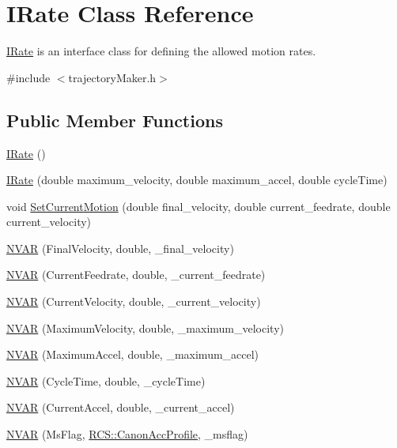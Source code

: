\hypertarget{classIRate}{\section{I\-Rate Class Reference}
\label{classIRate}
}


\hyperlink{classIRate}{I\-Rate} is an interface class for defining the allowed motion rates.  




{\ttfamily \#include $<$trajectory\-Maker.\-h$>$}

\subsection*{Public Member Functions}
\begin{DoxyCompactItemize}
\item 
\hyperlink{classIRate_a4cc7acdfa6770b7a28b3be6ec90110d9}{I\-Rate} ()
\item 
\hyperlink{classIRate_ab2d1966894aa6d963a20f5e6d18097de}{I\-Rate} (double maximum\-\_\-velocity, double maximum\-\_\-accel, double cycle\-Time)
\item 
void \hyperlink{classIRate_a9a6f938787dd958daef0f8eb2c0836fc}{Set\-Current\-Motion} (double final\-\_\-velocity, double current\-\_\-feedrate, double current\-\_\-velocity)
\item 
\hyperlink{classIRate_ad20f3c10a92de570de814b8c33c55813}{N\-V\-A\-R} (Final\-Velocity, double, \-\_\-final\-\_\-velocity)
\item 
\hyperlink{classIRate_ac083b3315892fb042e0240fa37635405}{N\-V\-A\-R} (Current\-Feedrate, double, \-\_\-current\-\_\-feedrate)
\item 
\hyperlink{classIRate_a52f26275fc49b2fd4c5b69291185a6db}{N\-V\-A\-R} (Current\-Velocity, double, \-\_\-current\-\_\-velocity)
\item 
\hyperlink{classIRate_a26f1529cb8c8cc9694ae82ed8e153563}{N\-V\-A\-R} (Maximum\-Velocity, double, \-\_\-maximum\-\_\-velocity)
\item 
\hyperlink{classIRate_aa338ed93323d145c8eb4e656625e9333}{N\-V\-A\-R} (Maximum\-Accel, double, \-\_\-maximum\-\_\-accel)
\item 
\hyperlink{classIRate_a9292518c87c8e371ba55b6aa49ad1706}{N\-V\-A\-R} (Cycle\-Time, double, \-\_\-cycle\-Time)
\item 
\hyperlink{classIRate_ac6149473cf0f8e1e6d90255e8da44e89}{N\-V\-A\-R} (Current\-Accel, double, \-\_\-current\-\_\-accel)
\item 
\hyperlink{classIRate_a6555656cff42f8e9f6e633876db9b6c1}{N\-V\-A\-R} (Ms\-Flag, \hyperlink{namespaceRCS_a452a9217023e577031dcdf7e533b2ead}{R\-C\-S\-::\-Canon\-Acc\-Profile}, \-\_\-msflag)
\end{DoxyCompactItemize}


